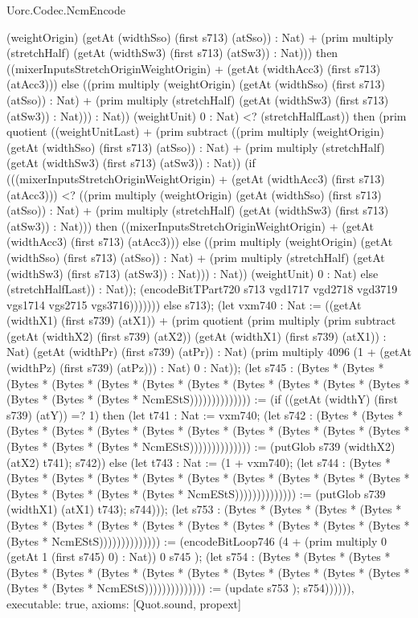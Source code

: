 \begin{lexlean}{Uorc.Codec.NcmEncode}
\begin{semanticmodule}
{(weightOrigin) (getAt (widthSso) (first s713) (atSso)) : Nat) + (prim multiply (stretchHalf) (getAt (widthSw3) (first s713) (atSw3)) : Nat))) then ((mixerInputsStretchOriginWeightOrigin) + (getAt (widthAcc3) (first s713) (atAcc3))) else ((prim multiply (weightOrigin) (getAt (widthSso) (first s713) (atSso)) : Nat) + (prim multiply (stretchHalf) (getAt (widthSw3) (first s713) (atSw3)) : Nat))) : Nat)) (weightUnit) 0 : Nat) <? (stretchHalfLast)) then (prim quotient ((weightUnitLast) + (prim subtract ((prim multiply (weightOrigin) (getAt (widthSso) (first s713) (atSso)) : Nat) + (prim multiply (stretchHalf) (getAt (widthSw3) (first s713) (atSw3)) : Nat)) (if (((mixerInputsStretchOriginWeightOrigin) + (getAt (widthAcc3) (first s713) (atAcc3))) <? ((prim multiply (weightOrigin) (getAt (widthSso) (first s713) (atSso)) : Nat) + (prim multiply (stretchHalf) (getAt (widthSw3) (first s713) (atSw3)) : Nat))) then ((mixerInputsStretchOriginWeightOrigin) + (getAt (widthAcc3) (first s713) (atAcc3))) else ((prim multiply (weightOrigin) (getAt (widthSso) (first s713) (atSso)) : Nat) + (prim multiply (stretchHalf) (getAt (widthSw3) (first s713) (atSw3)) : Nat))) : Nat)) (weightUnit) 0 : Nat) else (stretchHalfLast)) : Nat)); (encodeBitTPart720 s713 vgd1717 vgd2718 vgd3719 vgs1714 vgs2715 vgs3716))))))) else s713); (let vxm740 : Nat := ((getAt (widthX1) (first s739) (atX1)) + (prim quotient (prim multiply (prim subtract (getAt (widthX2) (first s739) (atX2)) (getAt (widthX1) (first s739) (atX1)) : Nat) (getAt (widthPr) (first s739) (atPr)) : Nat) (prim multiply 4096 (1 + (getAt (widthPz) (first s739) (atPz))) : Nat) 0 : Nat)); (let s745 : (Bytes * (Bytes * (Bytes * (Bytes * (Bytes * (Bytes * (Bytes * (Bytes * (Bytes * (Bytes * (Bytes * (Bytes * (Bytes * (Bytes * NcmEStS)))))))))))))) := (if ((getAt (widthY) (first s739) (atY)) =? 1) then (let t741 : Nat := vxm740; (let s742 : (Bytes * (Bytes * (Bytes * (Bytes * (Bytes * (Bytes * (Bytes * (Bytes * (Bytes * (Bytes * (Bytes * (Bytes * (Bytes * (Bytes * NcmEStS)))))))))))))) := (putGlob s739 (widthX2) (atX2) t741); s742)) else (let t743 : Nat := (1 + vxm740); (let s744 : (Bytes * (Bytes * (Bytes * (Bytes * (Bytes * (Bytes * (Bytes * (Bytes * (Bytes * (Bytes * (Bytes * (Bytes * (Bytes * (Bytes * NcmEStS)))))))))))))) := (putGlob s739 (widthX1) (atX1) t743); s744))); (let s753 : (Bytes * (Bytes * (Bytes * (Bytes * (Bytes * (Bytes * (Bytes * (Bytes * (Bytes * (Bytes * (Bytes * (Bytes * (Bytes * (Bytes * NcmEStS)))))))))))))) := (encodeBitLoop746 (4 + (prim multiply 0 (getAt 1 (first s745) 0) : Nat)) 0 s745 ); (let s754 : (Bytes * (Bytes * (Bytes * (Bytes * (Bytes * (Bytes * (Bytes * (Bytes * (Bytes * (Bytes * (Bytes * (Bytes * (Bytes * (Bytes * NcmEStS)))))))))))))) := (update s753 ); s754)))))),
  executable: true,
  axioms: [Quot.sound, propext]
}


\end{semanticmodule}
\end{lexlean}
